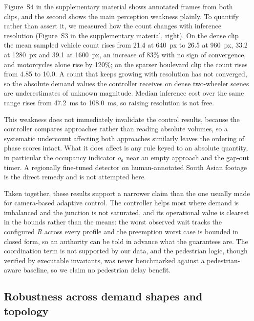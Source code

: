 \documentclass[journal]{IEEEtran}
\begin{document}
Figure~S4 in the supplementary material shows annotated frames from both clips, and the second shows the main
perception weakness plainly. To quantify rather than assert it, we measured how the count changes with
inference resolution (Figure~S3 in the supplementary material, right). On the dense clip the mean sampled vehicle
count rises from 21.4 at 640~px to 26.5 at 960~px, 33.2 at 1280~px and 39.1 at 1600~px, an increase of
83\% with no sign of convergence, and motorcycles alone rise by 120\%; on the sparser boulevard clip
the count rises from 4.85 to 10.0. A count that keeps growing with resolution has not converged, so the
absolute demand values the controller receives on dense two-wheeler scenes are underestimates of
unknown magnitude. Median inference cost over the same range rises from 47.2~ms to 108.0~ms, so raising
resolution is not free.

This weakness does not immediately invalidate the control results, because the controller compares
approaches rather than reading absolute volumes, so a systematic undercount affecting both approaches
similarly leaves the ordering of phase scores intact. What it does affect is any rule keyed to an
absolute quantity, in particular the occupancy indicator $o_a$ near an empty approach and the gap-out
timer. A regionally fine-tuned detector on human-annotated South Asian footage is the direct remedy and
is not attempted here.

Taken together, these results support a narrower claim than the one usually made for camera-based adaptive
control. The controller helps most where demand is imbalanced and the junction is not saturated, and its
operational value is clearest in the bounds rather than the means: the worst observed wait tracks the
configured $R$ across every profile and the preemption worst case is bounded in closed form, so an
authority can be told in advance what the guarantees are. The coordination term is not supported by our
data, and the pedestrian logic, though verified by executable invariants, was never benchmarked against a
pedestrian-aware baseline, so we claim no pedestrian delay benefit.

\subsection{Robustness across demand shapes and topology}
\label{sec:robustness}
\end{document}
